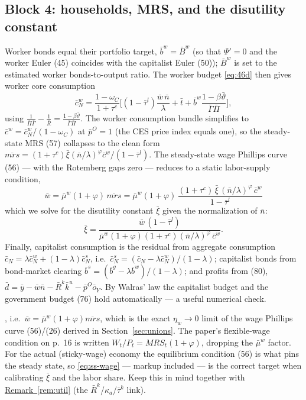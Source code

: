 \subsection{Block 4: households, MRS, and the disutility constant}
Worker bonds equal their portfolio target, $\bar b^w=\bar B^w$ (so that $\Psi'=0$ and the worker Euler
(45) coincides with the capitalist Euler (50)); $\bar B^w$ is set to the estimated worker
bonds-to-output ratio. The worker budget \eqref{eq:46d} then gives worker core consumption
\begin{equation}\label{eq:ss-cwn}
\bar c^w_N=\frac{1-\omega_C}{1+\tau^c}\Big[(1-\bar\tau^l)\frac{\bar w\,\bar n}{\lambda}+\bar t
+\bar b^w\frac{1-\beta\bar\vartheta}{\bar\Gamma\bar\Pi}\Big],
\end{equation}
using $\tfrac{1}{\bar\Pi\bar\Gamma}-\tfrac{1}{\bar R}=\tfrac{1-\beta\bar\vartheta}{\bar\Gamma\bar\Pi}$.
The worker consumption bundle simplifies to $\bar c^w=\bar c^w_N/(1-\omega_C)$ at $\bar p^O=1$ (the CES
price index equals one), so the steady-state MRS (57) collapses to the clean form
$\overline{mrs}=(1+\tau^c)\bar\xi(\bar n/\lambda)^\varphi\bar c^w/(1-\bar\tau^l)$. The steady-state wage
Phillips curve (56) --- with the Rotemberg gaps zero --- reduces to a static labor-supply condition,
\begin{equation}\label{eq:ss-wage}
\boxed{\,\bar w=\bar\mu^w(1+\varphi)\,\overline{mrs}
=\bar\mu^w(1+\varphi)\,\frac{(1+\tau^c)\,\bar\xi\,(\bar n/\lambda)^\varphi\,\bar c^w}{1-\bar\tau^l}\,}
\end{equation}
which we solve for the disutility constant $\bar\xi$ given the normalization of $\bar n$:
\begin{equation}\label{eq:ss-xi}
\bar\xi=\frac{\bar w\,(1-\bar\tau^l)}{\bar\mu^w(1+\varphi)(1+\tau^c)(\bar n/\lambda)^\varphi\,\bar c^w} .
\end{equation}
Finally, capitalist consumption is the residual from aggregate consumption
$\bar c_N=\lambda\bar c^w_N+(1-\lambda)\bar c^s_N$, i.e.\ $\bar c^s_N=(\bar c_N-\lambda\bar c^w_N)/(1-\lambda)$;
capitalist bonds from bond-market clearing $\bar b^s=(\bar b^g-\lambda\bar b^w)/(1-\lambda)$; and profits
from (80), $\bar d=\bar y-\bar w\bar n-\bar R^k\bar k^u-\bar p^O\bar o_Y$. By Walras' law the capitalist
budget and the government budget (76) hold automatically --- a useful numerical check.

\begin{remark}\label{rem:wagess}
, i.e.\
$\bar w=\bar\mu^w(1+\varphi)\overline{mrs}$, which is the exact $\eta_w\!\to\!0$ limit of the wage
Phillips curve (56)/(26) derived in Section~\ref{sec:unions}. The paper's flexible-wage condition on
p.\ 16 is written $W_t/P_t=MRS_t(1+\varphi)$, dropping the $\bar\mu^w$ factor. For the actual
(sticky-wage) economy the equilibrium condition (56) is what pins the steady state, so
\eqref{eq:ss-wage} --- markup included --- is the correct target when calibrating $\bar\xi$ and the
labor share. Keep this in mind together with \hyperref[rem:util]{Remark~\ref*{rem:util}}
(the $\bar R^k$/$\kappa_a$/$\bar\tau^k$ link).
\end{remark}



